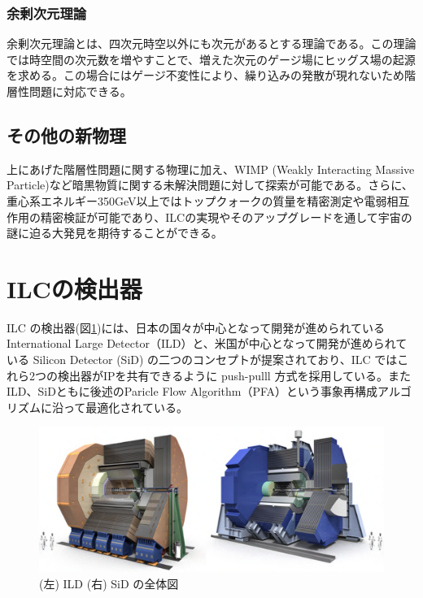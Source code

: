 \subsubsection{余剰次元理論}
余剰次元理論とは、四次元時空以外にも次元があるとする理論である。この理論では時空間の次元数を増やすことで、増えた次元のゲージ場にヒッグス場の起源を求める。この場合にはゲージ不変性により、繰り込みの発散が現れないため階層性問題に対応できる。
\subsection{その他の新物理}
上にあげた階層性問題に関する物理に加え、WIMP (Weakly Interacting Massive Particle)など暗黒物質に関する未解決問題に対して探索が可能である。さらに、重心系エネルギー350GeV以上ではトップクォークの質量を精密測定や電弱相互作用の精密検証が可能であり、ILCの実現やそのアップグレードを通して宇宙の謎に迫る大発見を期待することができる。
\section{ILCの検出器}
ILC の検出器(図\ref{detector})には、日本の国々が中心となって開発が進められている International Large Detector（ILD）と、米国が中心となって開発が進められている Silicon Detector (SiD) の二つのコンセプトが提案されており、ILC ではこれら2つの検出器がIPを共有できるように push-pulll 方式を採用している。またILD、SiDともに後述のParicle Flow Algorithm（PFA）という事象再構成アルゴリズムに沿って最適化されている。
\begin{figure}[h]
	\begin{center}
 \includegraphics[keepaspectratio, scale=0.4]
 	{Figure/Introduction/detector.png}
 		\caption{(左) ILD (右) SiD の全体図}
 		\label{detector}
	\end{center}
\end{figure}

